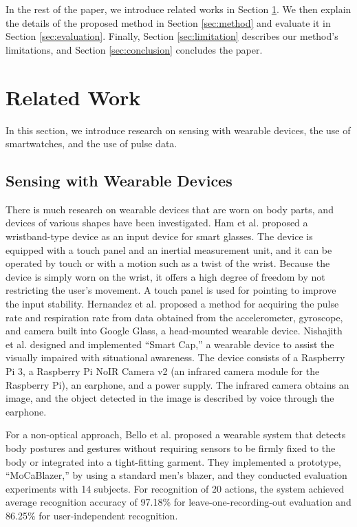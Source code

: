 \documentclass[sigchi,authordraft]{acmart}
\begin{document}
In the rest of the paper, we introduce related works in Section \ref{sec:related}. We then explain the details of the proposed method in Section \ref{sec:method} and evaluate it in Section \ref{sec:evaluation}. Finally, Section \ref{sec:limitation} describes our method's limitations, and Section \ref{sec:conclusion} concludes the paper.



\section{Related Work}
\label{sec:related}
In this section, we introduce research on sensing with wearable devices, the use of smartwatches, and the use of pulse data.

\subsection{Sensing with Wearable Devices}
There is much research on wearable devices that are worn on body parts, and devices of various shapes have been investigated. Ham et al. \cite{smart_wristband} proposed a wristband-type device as an input device for smart glasses. The device is equipped with a touch panel and an inertial measurement unit, and it can be operated by touch or with a motion such as a twist of the wrist. Because the device is simply worn on the wrist, it offers a high degree of freedom by not restricting the user's movement. A touch panel is used for pointing to improve the input stability. Hernandez et al. \cite{bioglass} proposed a method for acquiring the pulse rate and respiration rate from data obtained from the accelerometer, gyroscope, and camera built into Google Glass, a head-mounted wearable device. Nishajith et al. \cite{smart_cap} designed and implemented ``Smart Cap,'' a wearable device to assist the visually impaired with situational awareness. The device consists of a Raspberry Pi 3, a Raspberry Pi NoIR Camera v2 (an infrared camera module for the Raspberry Pi), an earphone, and a power supply. The infrared camera obtains an image, and the object detected in the image is described by voice through the earphone.\par

For a non-optical approach, Bello et al. \cite{MoCapaci} proposed a wearable system that detects body postures and gestures without requiring sensors to be firmly fixed to the body or integrated into a tight-fitting garment. They implemented a prototype, ``MoCaBlazer,'' by using a standard men's blazer, and they conducted evaluation experiments with 14 subjects. For recognition of 20 actions, the system achieved average recognition accuracy of 97.18\% for leave-one-recording-out evaluation and 86.25\% for user-independent recognition.\par
\end{document}

